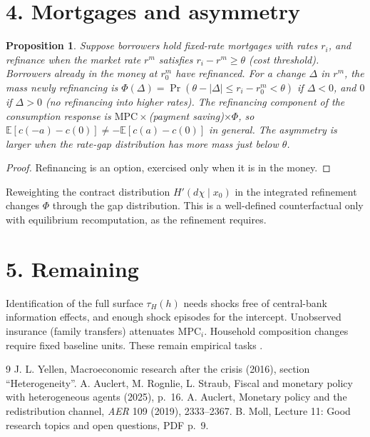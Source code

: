 \documentclass[11pt]{article}
\newtheorem{proposition}[theorem]{Proposition}
\theoremstyle{definition}
\begin{document}
\section*{4. Mortgages and asymmetry}
\begin{proposition}\label{prop:refi}
Suppose borrowers hold fixed-rate mortgages with rates $r_i$, and refinance when the market rate $r^m$ satisfies
$r_i-r^m\ge\theta$ (cost threshold). Borrowers already in the money at $r^m_0$ have refinanced. For a change $\Delta$ in $r^m$, the mass newly refinancing is
$\Phi(\Delta)=\Pr(\theta-|\Delta|\le r_i-r^m_0<\theta)$ if $\Delta<0$, and $0$ if $\Delta>0$ (no refinancing into higher rates).
The refinancing component of the consumption response is $\mathrm{MPC}\times$(payment saving)$\times\Phi$, so
$\mathbb E[c(-a)-c(0)]\ne-\mathbb E[c(a)-c(0)]$ in general. The asymmetry is larger when the rate-gap distribution has more
mass just below $\theta$.
\end{proposition}
\begin{proof}
Refinancing is an option, exercised only when it is in the money.
\end{proof}
Reweighting the contract distribution $H'(d\chi\mid x_0)$ in the integrated refinement changes $\Phi$ through the gap
distribution. This is a well-defined counterfactual only with equilibrium recomputation, as the refinement requires.

\section*{5. Remaining}
Identification of the full surface $\tau_H(h)$ needs shocks free of central-bank information effects, and enough shock
episodes for the intercept. Unobserved insurance (family transfers) attenuates $\mathrm{MPC}_i$. Household composition changes
require fixed baseline units. These remain empirical tasks \cite{yellen,moll}.

\begin{thebibliography}{9}
 J. L. Yellen, Macroeconomic research after the crisis (2016), section ``Heterogeneity''.
 A. Auclert, M. Rognlie, L. Straub, Fiscal and monetary policy with heterogeneous agents (2025), p.~16.
 A. Auclert, Monetary policy and the redistribution channel, \emph{AER} 109 (2019), 2333--2367.
 B. Moll, Lecture 11: Good research topics and open questions, PDF p.~9.
\end{thebibliography}
\end{document}

